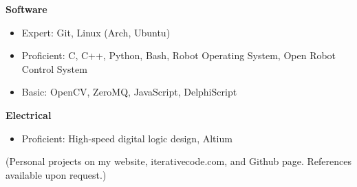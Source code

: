 \documentclass[10pt,letterpaper,margin]{res}
\begin{document}
\begin{resume}
{\bf Software}\vspace{0.0em}

\begin{itemize}
    \item Expert: \hspace{10pt} Git, Linux (Arch, Ubuntu)
    \item Proficient: C, C++, Python, Bash, Robot Operating System, Open Robot Control System
    \item Basic: \hspace{17pt} OpenCV, ZeroMQ, JavaScript, DelphiScript
\end{itemize}

{\bf Electrical}\vspace{0.0em}

\begin{itemize}
    \item Proficient: High-speed digital logic design, Altium
\end{itemize}


\vspace{0.5em}
{\footnotesize (Personal projects on my website, iterativecode.com, and Github
page. References available upon request.)}

% 

\end{resume}



% 
% 
\end{document}
